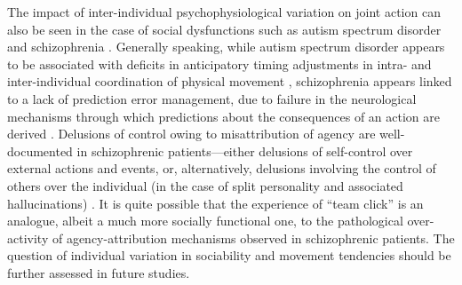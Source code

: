   The impact of inter-individual psychophysiological variation on joint action can also be seen in the case of social dysfunctions such as autism spectrum disorder \citep{Isenhower2012} and schizophrenia \citep{Varlet2012}.  Generally speaking,  while autism spectrum disorder appears to be associated with deficits in anticipatory timing adjustments in intra- and inter-individual coordination of physical movement \citep{Martineau2010}, schizophrenia appears linked to a lack of prediction error management, due to failure in the neurological mechanisms through which predictions about the consequences of an action are derived \citep{Frith2000}.  Delusions of control owing to misattribution of agency are well-documented in schizophrenic patients---either delusions of self-control over external actions and events, or, alternatively, delusions involving the control of others over the individual (in the case of split personality and associated hallucinations) \citep{Frith2007}. It is quite possible that the experience of ``team click'' is an analogue, albeit a much more socially functional one, to the pathological over-activity of agency-attribution mechanisms observed in schizophrenic patients.  The question of individual variation in sociability and movement tendencies should be further assessed in future studies.

